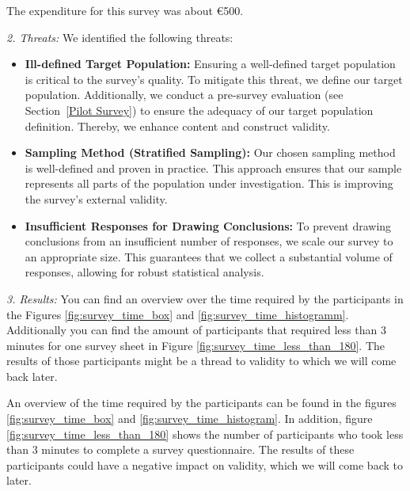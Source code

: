 \documentclass[%
class=scrreprt,
chapterprefix=false,%
open=right,%
twoside=false,%
paper=a4,%
logofile={Logo\_zentral\_farbig\_EN.png},%
thesistype=master,%
UKenglish,%
]{se2thesis}
\theoremstyle{definition}
\begin{document}
	The expenditure for this survey was about €500.				
	
\textit{2. Threats:}
	We identified the following threats:
	\begin{itemize}
		\item \textbf{Ill-defined Target Population:} Ensuring a well-defined target population is critical to the survey's quality. To mitigate this threat, we define our target population. Additionally, we conduct a pre-survey evaluation (see Section~\ref{Pilot Survey}) to ensure the adequacy of our target population definition. Thereby, we enhance content and construct validity.
		
		\item \textbf{Sampling Method (Stratified Sampling):} Our chosen sampling method is well-defined and proven in practice. This approach ensures that our sample represents all parts of the population under investigation. This is improving the survey's external validity.
		
		\item \textbf{Insufficient Responses for Drawing Conclusions:} To prevent drawing conclusions from an insufficient number of responses, we scale our survey to an appropriate size. This guarantees that we collect a substantial volume of responses, allowing for robust statistical analysis.
	\end{itemize}
	
\textit{3. Results:}
	You can find an overview over the time required by the participants in the Figures \ref{fig:survey_time_box} and \ref{fig:survey_time_histogramm}. Additionally you can find the amount of participants that required less than 3 minutes for one survey sheet in Figure \ref{fig:survey_time_less_than_180}. The results of those participants might be a thread to validity to which we will come back later.
	
	An overview of the time required by the participants can be found in the figures \ref{fig:survey_time_box} and \ref{fig:survey_time_histogram}. In addition, figure \ref{fig:survey_time_less_than_180} shows the number of participants who took less than 3 minutes to complete a survey questionnaire. The results of these participants could have a negative impact on validity, which we will come back to later. 
	
\end{document}
